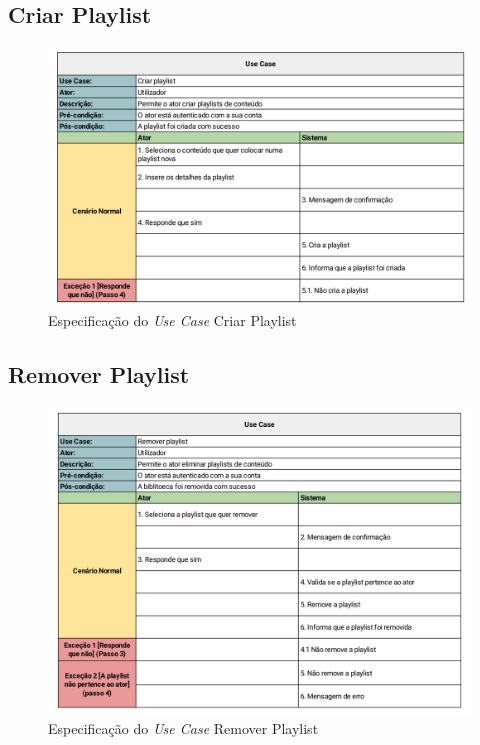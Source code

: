 \documentclass[a4paper]{report}
\begin{document}
\subsection{Criar Playlist}

\begin{figure}[H]
	\centering 
    \includegraphics[width=\textwidth]{images/Criar_Biblioteca.png}  
    \caption{Especificação do \emph{Use Case} Criar Playlist}
\end{figure}

\subsection{Remover Playlist}

\begin{figure}[H]
	\centering 
    \includegraphics[width=\textwidth]{images/Eliminar_Biblioteca.png}  
    \caption{Especificação do \emph{Use Case} Remover Playlist}
\end{figure}
\end{document}
